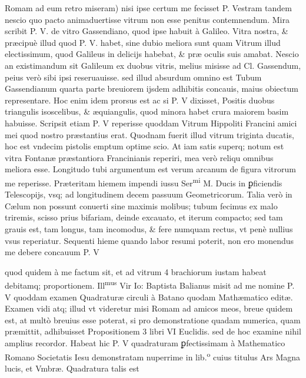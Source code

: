 \documentclass[11pt,a4paper]{article}
\begin{document}
Romam ad eum retro miseram) nisi ipse certum me fecisset P. Vestram tandem nescio quo pacto animaduertisse vitrum non esse penitus contemnendum. Mira scribit P. V. de vitro Gassendiano, quod ipse habuit à Galileo. Vitra nostra, \& præcipuè illud quod P. V. habet, sine dubio meliora sunt quam Vitrum illud electissimum, quod Galileus in delicijs habebat, \& præ oculis suis amabat. Nescio an existimandum sit Galileum ex duobus vitris, melius misisse ad Cl. Gassendum, peius verò sibi ipsi reseruauisse. sed illud absurdum omnino est Tubum Gassendianum quarta parte breuiorem ijsdem adhibitis concauis, maius obiectum representare. Hoc enim idem prorsus est ac si P. V dixisset, Positis duobus triangulis isoscelibus, \& æquiangulis, quod minora habet crura maiorem basim habuisse. Scripsit etiam P. V reperisse quoddam Vitrum Hippoliti Francini amici mei quod nostro præstantius erat. Quodnam fuerit illud vitrum triginta ducatis, hoc est vndecim pistolis emptum optime scio. At iam satis superq; notum est vitra Fontanæ præstantiora Francinianis reperiri, mea verò reliqu omnibus meliora esse. Longitudo tubi argumentum est verum arcanum de figura vitrorum me reperisse. Præteritam hiemem impendi iussu Ser\textsuperscript{mi} M. Ducis in ꝑficiendis Telescopijs, vsq; ad longitudinem decem passuum Geometricorum. Talia verò in Cælum non possunt conuerti sine maximis molibus; tubum fecimus ex malo triremis, scisso prius bifariam, deinde excauato, et iterum compacto; sed tam grauis est, tam longus, tam incomodus, \& fere numquam rectus, vt penè nullius vsus reperiatur. Sequenti hieme quando labor resumi poterit, non ero monendus me debere concauum P. V


quod quidem à me factum sit, et ad vitrum 4 brachiorum iustam habeat debitamq; proportionem. Ill\textsuperscript{mus} Vir Io: Baptista Balianus misit ad me nomine P. V quoddam examen Quadraturæ circuli à Batano quodam Mathæmatico editæ. Examen vidi atq; illud vt videretur misi Romam ad amicos meos, breue quidem est, at multò breuius esse poterat, si pro demonstratione quadam numerica, quam præmittit, adhibuisset Propositionem 3 libri VI Euclidis. sed de hoc examine nihil amplius recordor. Habeat hic P. V quadraturam ꝑfectissimam à Mathematico Romano Societatis Iesu demonstratam nuperrime in lib.\textsuperscript{o} cuius titulus Ars Magna lucis, et Vmbræ. Quadratura talis est
\end{document}
